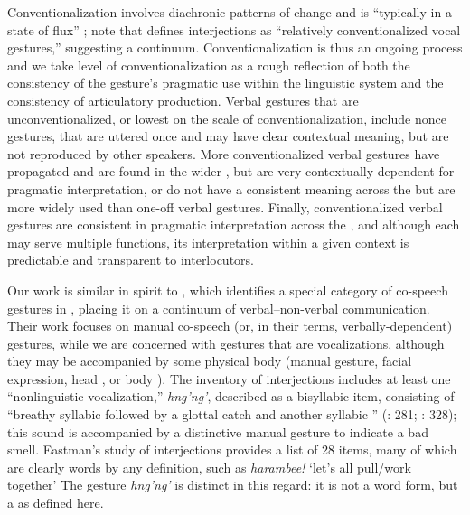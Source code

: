 \documentclass[output=paper
,newtxmath
,modfonts
,nonflat]{langsci/langscibook}
\begin{document}
 Conventionalization involves diachronic patterns of change and is ``typically in a state of flux'' \citep[27]{ferguson1994}; note that \citet[106]{ameka1992} defines interjections as ``relatively conventionalized vocal gestures,'' suggesting a continuum. Conventionalization is thus an ongoing process  and we take level of conventionalization as a rough reflection of both the consistency of the gesture's pragmatic use within the linguistic system and the consistency of articulatory production. Verbal gestures that are unconventionalized, or lowest on the scale of conventionalization, include nonce gestures, that are uttered once and may have clear contextual meaning, but are not   reproduced by other speakers. More conventionalized verbal gestures have propagated and are found in the wider , but are very contextually dependent  for  pragmatic interpretation, or do not have a consistent meaning across the  but are more widely used than one-off verbal gestures. Finally, conventionalized verbal gestures are consistent in  pragmatic interpretation across the , and although each  may serve multiple functions, its interpretation within a given context is predictable and transparent to interlocutors.
  
Our work is similar in spirit to \citet{eastmanomar1985}, which identifies a special category of co-speech gestures in , placing it on a continuum of verbal--non-verbal communication.  Their work focuses on manual co-speech (or, in their terms, verbally-dependent) gestures, while we are concerned with gestures that are vocalizations, although they may be accompanied by some physical body  (manual gesture, facial expression, head , or body ). The inventory of  interjections includes at least one  ``nonlinguistic vocalization,'' \textit{hng'ng'}, described as a bisyllabic item, consisting of  ``breathy syllabic  followed by a glottal catch and another syllabic '' (\citealt{eastman1992}: 281; \citealt{eastmanomar1985}: 328); this sound is accompanied by a distinctive manual gesture to indicate a bad smell. Eastman's study of  interjections provides a list of 28 items, many of which are clearly words by any definition, such as \textit{harambee!} `let's all pull/work together' The gesture \textit{hng'ng'} is distinct in this regard: it is not a word form, but a  as defined here.
\end{document}
